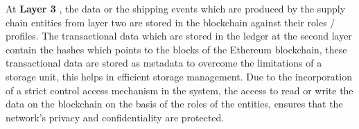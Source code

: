\documentclass[12pt,a4paper,twocolumn,fleqn]{article}
\begin{document}
At \textbf{Layer 3} , the data or the shipping events which are produced by the supply chain entities from layer two are stored in the blockchain against their roles / profiles. The transactional data which are stored in the ledger at the second layer contain the hashes which points to the blocks of the Ethereum blockchain, these transactional data are stored as metadata to overcome the limitations of a storage unit, this helps in efficient storage management. Due to the incorporation of a strict control access mechanism in the system, the access to read or write the data on the blockchain on the basis of the roles of the entities, ensures that the network's privacy and confidentiality are protected. 
\newpage
  \pagestyle{fancy}
  \fancyhf{}
  \chead{}
  \renewcommand{\headrulewidth}{0.4pt}%
\renewcommand{\footrulewidth}{0.4pt}%
\normalsize
\end{document}
